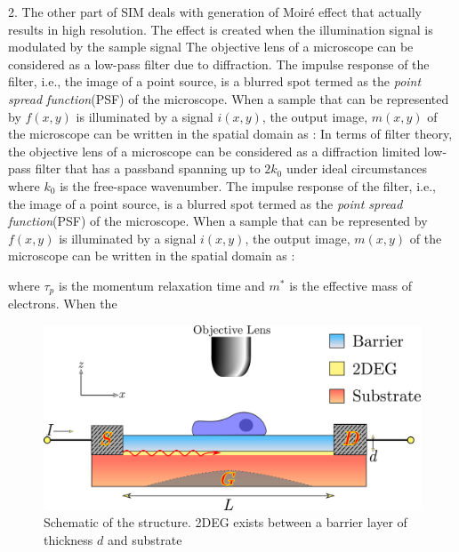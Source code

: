 \documentclass[11pt]{article}
\begin{document}
2. The other part of SIM deals with generation of Moiré effect that actually results in high resolution. The effect is created when the illumination signal is modulated by the sample signal
The objective lens of a microscope can be considered as a low-pass filter due to diffraction. The impulse response of the filter, i.e., the image of a point source, is a blurred spot termed as the \emph{point spread function}(PSF) of the microscope. When a sample that can be represented by $f(x,y)$ is illuminated by a signal $i(x,y)$, the output image, $m(x,y)$ of the microscope can be written in the spatial domain as \cite{Jost_2013}:
In terms of filter theory, the objective lens of a microscope can be considered as a diffraction limited low-pass filter that has a passband spanning up to $2k_0$ under ideal circumstances where $k_0$ is the free-space wavenumber. The impulse response of the filter, i.e., the image of a point source, is a blurred spot termed as the \emph{point spread function}(PSF) of the microscope. When a sample that can be represented by $f(x,y)$ is illuminated by a signal $i(x,y)$, the output image, $m(x,y)$ of the microscope can be written in the spatial domain as \cite{Jost_2013}:

%
where $\tau_p$ is the momentum relaxation time and $m^{\ast}$ is the effective  mass of electrons. When the


\begin{figure}[h!]
  \centering
  \includegraphics[scale=.5]{Microcopic_Structure.png}
  \caption{Schematic of the structure. 2DEG exists between a barrier layer of thickness $d$ and substrate}
  \label{fig:scheme}
\end{figure}
\end{document}

